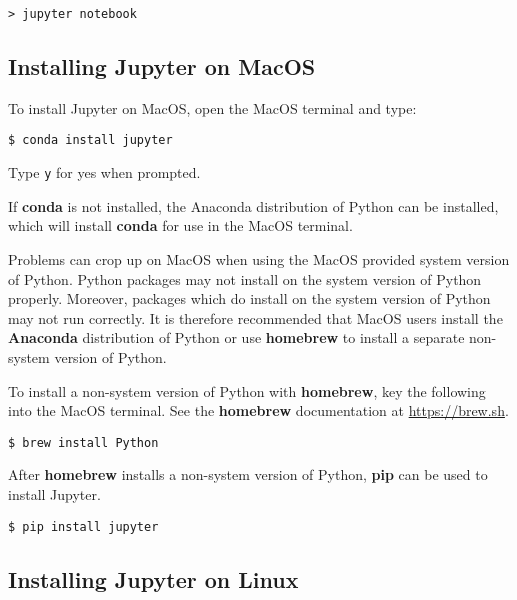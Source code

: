 \documentclass{book}
\newcommand{\passthrough}[1]{#1}
\begin{document}
\begin{lstlisting}
> jupyter notebook
\end{lstlisting}
    




    
        \hypertarget{installing-jupyter-on-macos}{%
\subsection{Installing Jupyter on
MacOS}\label{installing-jupyter-on-macos}}

To install Jupyter on MacOS, open the MacOS terminal and type:

\begin{lstlisting}
$ conda install jupyter
\end{lstlisting}

Type \passthrough{\lstinline!y!} for yes when prompted.

If \textbf{conda} is not installed, the Anaconda distribution of Python
can be installed, which will install \textbf{conda} for use in the MacOS
terminal.

Problems can crop up on MacOS when using the MacOS provided system
version of Python. Python packages may not install on the system version
of Python properly. Moreover, packages which do install on the system
version of Python may not run correctly. It is therefore recommended
that MacOS users install the \textbf{Anaconda} distribution of Python or
use \textbf{homebrew} to install a separate non-system version of
Python.

To install a non-system version of Python with \textbf{homebrew}, key
the following into the MacOS terminal. See the \textbf{homebrew}
documentation at \href{https://brew.sh/}{https://brew.sh}.

\begin{lstlisting}
$ brew install Python
\end{lstlisting}

After \textbf{homebrew} installs a non-system version of Python,
\textbf{pip} can be used to install Jupyter.

\begin{lstlisting}
$ pip install jupyter
\end{lstlisting}
    




    
        \hypertarget{installing-jupyter-on-linux}{%
\subsection{Installing Jupyter on
Linux}\label{installing-jupyter-on-linux}}
\end{document}
